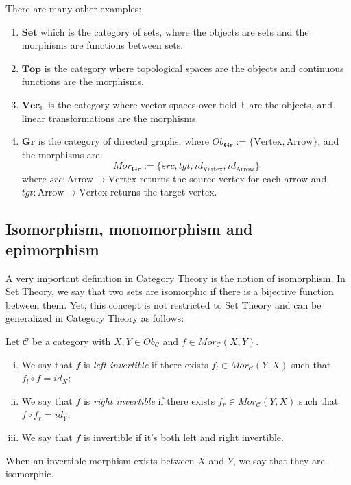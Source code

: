 There are many other examples:
\begin{enumerate}[1.]
	\item $\mathbf{Set}$ which is the category of sets, where the objects are sets and the morphisms are functions between sets.
	\item $\mathbf{Top}$ is the category where topological spaces are the objects and continuous functions are the morphisms.
	\item $\mathbf{Vec}_\mathbb F$ is the category where vector spaces over field $\mathbb F$ are the objects,
	      and linear transformations are the morphisms.
	\item $\mathbf{Gr}$ is the category of directed graphs, where $Ob_{\mathbf{Gr}} := \{\text{Vertex}, \text{Arrow}\}$,
	      and the morphisms are
	      \begin{displaymath}
		      Mor_{\mathbf{Gr}} := \{
		      src,
		      tgt,
		      id_{\text{Vertex}},
		      id_{\text{Arrow}}
		      \}
	      \end{displaymath}
	      where $src:\text{Arrow} \to \text{Vertex}$ returns the source vertex for each arrow and
	      $tgt:\text{Arrow} \to \text{Vertex}$ returns the target vertex.
\end{enumerate}


\subsection{Isomorphism, monomorphism and epimorphism}

A very important definition in Category Theory is the notion of isomorphism.
In Set Theory, we say that two sets are isomorphic if there is a bijective
function between them. Yet, this concept is not restricted to Set Theory
and can be generalized in Category Theory as follows:

\begin{definition}
	Let $\mathcal C$ be a category with $X,Y \in Ob_\mathcal C$ and $f \in Mor_\mathcal C (X,Y)$.
	\begin{enumerate}[(i)]
		\item We say that $f$ is \textit{left invertible} if there exists $f_l \in Mor_\mathcal C (Y,X)$ such
		      that $f_l \circ f = id_X$;
		\item We say that $f$ is \textit{right invertible} if there exists $f_r \in Mor_\mathcal C (Y,X)$ such
		      that $f \circ f_r = id_Y$;
		\item We say that $f$ is invertible if it's both left and right invertible.
	\end{enumerate}
	When an invertible morphism exists between $X$ and $Y$, we say that they are isomorphic.
	\label{def:CategoricalIsomorphism}
\end{definition}

